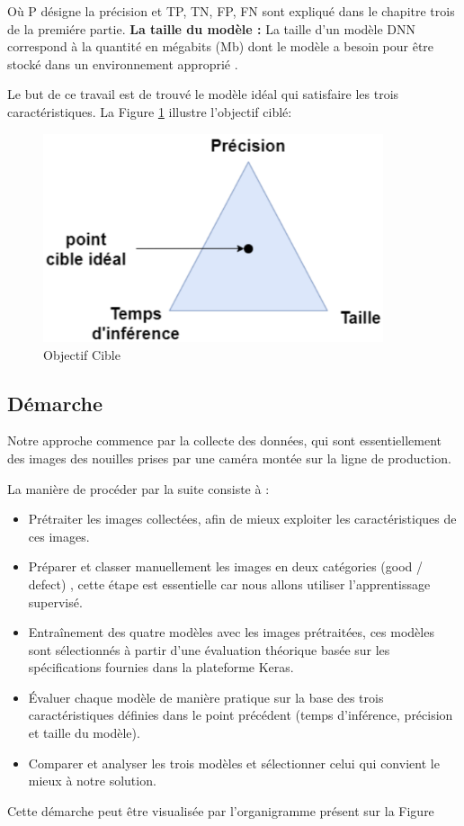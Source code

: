 Où P désigne la précision et TP, TN, FP, FN sont expliqué dans le chapitre trois de la premiére partie.  
\newpage
\textbf{La taille du modèle :} La taille d'un modèle DNN correspond à la quantité en mégabits (Mb) dont le modèle a besoin pour être stocké dans un environnement approprié .

Le but de ce travail est de trouvé le modèle idéal qui satisfaire les trois caractéristiques. La Figure \ref{ObjectifCible} illustre l’objectif ciblé: 

\begin{figure}[h]
    \centering
    \includegraphics[width=10cm]{assets/PartTwo/Chapterone/ObjectifCible.png}
    \caption{Objectif Cible}
    \label{ObjectifCible}
    \end{figure}

\subsection{Démarche}
Notre approche commence par la collecte des données, qui sont essentiellement des images des nouilles prises par une caméra montée sur la ligne de production. 

La manière de procéder par la suite consiste à : 
\begin{itemize}
    \item Prétraiter les images collectées, afin de mieux exploiter les caractéristiques de ces images. 
    \item Préparer et classer manuellement les images en deux catégories (good / defect) , cette étape est essentielle car nous allons utiliser l'apprentissage supervisé. 
    \item Entraînement des quatre modèles avec les images prétraitées, ces modèles sont sélectionnés à partir d'une évaluation théorique basée sur les spécifications fournies dans la plateforme Keras.
    \item Évaluer chaque modèle de manière pratique sur la base des trois caractéristiques définies dans le point précédent (temps d'inférence, précision et taille du modèle).
    \item Comparer et analyser les trois modèles et sélectionner celui qui convient le mieux à notre solution. 
\end{itemize}
\newpage
Cette démarche peut être visualisée par l’organigramme présent sur la Figure %
\newpage
